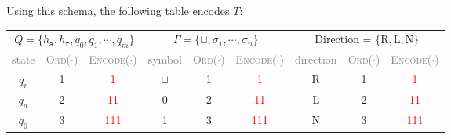 \documentclass{article}
\begin{document}
Using this schema, the following table encodes $T$:

\begin{table}[h]
    \centering
    \renewcommand{\arraystretch}{1.3}  %
    \begin{tabular}{|ccc|ccc|ccc|}
        \hline
        \multicolumn{3}{|c|}{$Q = \{h_{\mathtt{a}}, h_{\mathtt{r}}, q_0, q_1, \cdots , q_m\}$} & 
        \multicolumn{3}{c|}{$\Gamma = \{\sqcup, \sigma_1, \cdots , \sigma_n\}$} & 
        \multicolumn{3}{c|}{Direction = $\{\mathrm{R}, \mathrm{L}, \mathrm{N}\}$} \\
        \multicolumn{1}{|c}{\textcolor{gray}{state}} & 
        \multicolumn{1}{c}{\textcolor{gray}{\textsc{Ord}($\cdot$)}} & 
        \multicolumn{1}{c|}{\textcolor{gray}{\textsc{Encode}($\cdot$)}} & 
        \multicolumn{1}{c}{\textcolor{gray}{symbol}} & 
        \multicolumn{1}{c}{\textcolor{gray}{\textsc{Ord}($\cdot$)}} & 
        \multicolumn{1}{c|}{\textcolor{gray}{\textsc{Encode}($\cdot$)}} & 
        \multicolumn{1}{c}{\textcolor{gray}{direction}} & 
        \multicolumn{1}{c}{\textcolor{gray}{\textsc{Ord}($\cdot$)}} & 
        \multicolumn{1}{c|}{\textcolor{gray}{\textsc{Encode}($\cdot$)}} \\
        \hline
        \hline
        
            $q_r$ & 1 & \textcolor{red}{1} & 
            $\sqcup$ & 1 & \textcolor{red}{1} & 
            R & 1 & \textcolor{red}{1} \\
        
            $q_a$ & 2 & \textcolor{red}{11} & 
            0 & 2 & \textcolor{red}{11} & 
            L & 2 & \textcolor{red}{11} \\
        
            $q_0$ & 3 & \textcolor{red}{111} & 
            1 & 3 & \textcolor{red}{111} & 
            N & 3 & \textcolor{red}{111} \\
        
        \hline
    \end{tabular}
\end{table}
\end{document}

